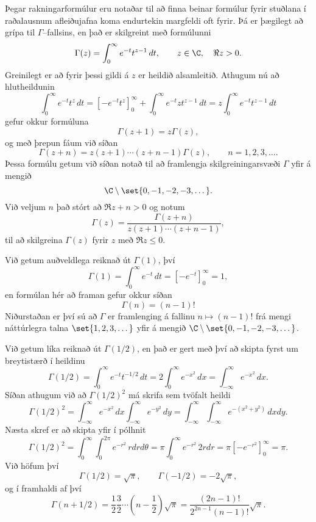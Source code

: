 \noindent
Þegar rakningarformúlur eru  notaðar til að finna beinar formúlur
fyrir stuðlana í raða\-lausnum afleiðujafna koma endurtekin
margfeldi oft fyrir.  Þá er  þægilegt að grípa til
$\Gamma$--fallsins, en það er skilgreint með formúlunni 
 \begin{equation*}\Gamma(z)=\int_0^\infty e^{-t}t^{z-1}\, dt, \qquad z\in \C, \quad \Re
z>0.
\label{3.3.1}
\end{equation*}
Greinilegt er að fyrir þessi gildi á $z$ er heildið alsamleitið.
Athugum nú að hlutheildunin
 $$\int_0^\infty e^{-t}t^{z}\, dt =\left[ -e^{-t}t^z\right]_0^\infty +
\int_0^\infty e^{-t}zt^{z-1}\, dt= z\int_0^\infty e^{-t}t^{z-1}\, dt  
 $$
gefur okkur formúluna
 \begin{equation*}\Gamma(z+1)=z\Gamma(z),
\label{3.3.2}
 \end{equation*}
og með þrepun fáum við síðan
 \begin{equation*}\Gamma(z+n)= z(z+1)\cdots(z+n-1)\Gamma(z), 
\qquad n=1,2,3,\dots.
\label{3.3.3}
 \end{equation*}
Þessa formúlu getum við síðan notað til að framlengja skilgreiningarsvæði
$\Gamma$ yfir á mengið
 $$\C\setminus\set{0,-1, -2, -3,\dots}.
 $$
Við veljum $n$ það stórt að $\Re z+n>0$ og notum  
 \begin{equation*}\Gamma(z)=\dfrac{\Gamma(z+n)}{z(z+1)\cdots(z+n-1)},
\label{3.3.4}
 \end{equation*}
til að skilgreina ${\Gamma}(z)$ 
fyrir $z$ með $\Re z\leq 0$. 

Við getum auðveldlega reiknað út $\Gamma(1)$, því 
 $$\Gamma(1)=\int_0^\infty e^{-t}\, dt=\left[-e^{-t}\right]_0^\infty=1,
 $$
en formúlan hér að framan  gefur okkur síðan
 \begin{equation*}\Gamma(n)=(n-1)!\label{3.3.5}
 \end{equation*}
Niðurstaðan er því sú að  ${\Gamma}$ er framlenging á fallinu 
$n\mapsto (n-1)!$ frá mengi náttúrlegra talna
$\set{1,2,3,\dots}$ yfir á mengið 
$\C\setminus\set{0,-1, -2, -3,\dots}$.


Við getum líka reiknað  út $\Gamma(1/2)$, en það er gert með því
að skipta fyrst um breytistærð í heildinu
 $$\Gamma(1/2)=\int_0^\infty e^{-t}t^{-1/2}\, dt =
2\int_0^\infty e^{-x^2}\, dx= \int_{-\infty}^\infty e^{-x^2}\, dx.
 $$
Síðan athugum við að $\Gamma(1/2)^2$ má skrifa sem tvöfalt heildi
 $$\Gamma(1/2)^2= 
\int_{-\infty}^\infty e^{-x^2}\, dx\int_{-\infty}^\infty e^{-y^2}\,dy=
\int_{-\infty}^\infty \int_{-\infty}^\infty e^{-(x^2+y^2)}\, dxdy.
 $$
Næsta skref er að skipta yfir í pólhnit
 $$\Gamma(1/2)^2=\int_0^\infty\int_0^{2\pi}e^{-r^2} \, rdrd\theta =
\pi \int_0^\infty e^{-r^2} \, 2rdr= \pi\left[-e^{-r^2}\right]_0^\infty=\pi.
 $$
Við höfum því 
 \begin{equation*}
\Gamma(1/2)=\sqrt\pi, \qquad \Gamma(-1/2)=-2\sqrt\pi,\label{3.3.6}
 \end{equation*}
og í framhaldi af því 
 $$\Gamma(n+1/2) =\frac 12\frac 32\cdots (n-\frac 12)\sqrt \pi=
\dfrac{(2n-1)!}{2^{2n-1}(n-1)!}\sqrt \pi.
 $$

